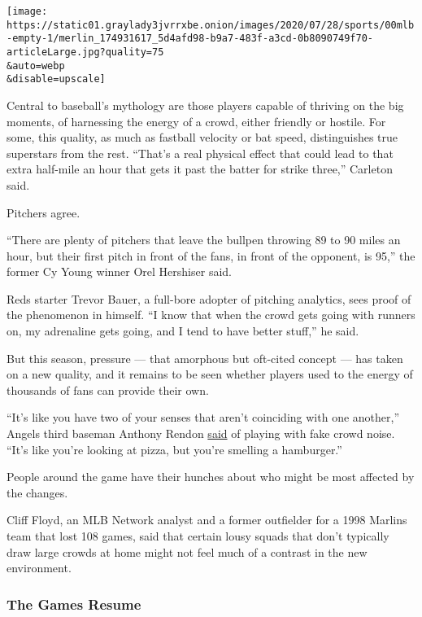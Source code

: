 \texttt{[image: https://static01.graylady3jvrrxbe.onion/images/2020/07/28/sports/00mlb-empty-1/merlin\_174931617\_5d4afd98-b9a7-483f-a3cd-0b8090749f70-articleLarge.jpg?quality=75\\\&auto=webp\\\&disable=upscale]}

Central to baseball's mythology are those players capable of thriving on
the big moments, of harnessing the energy of a crowd, either friendly or
hostile. For some, this quality, as much as fastball velocity or bat
speed, distinguishes true superstars from the rest. ``That's a real
physical effect that could lead to that extra half-mile an hour that
gets it past the batter for strike three,'' Carleton said.

Pitchers agree.

``There are plenty of pitchers that leave the bullpen throwing 89 to 90
miles an hour, but their first pitch in front of the fans, in front of
the opponent, is 95,'' the former Cy Young winner Orel Hershiser said.

Reds starter Trevor Bauer, a full-bore adopter of pitching analytics,
sees proof of the phenomenon in himself. ``I know that when the crowd
gets going with runners on, my adrenaline gets going, and I tend to have
better stuff,'' he said.

But this season, pressure --- that amorphous but oft-cited concept ---
has taken on a new quality, and it remains to be seen whether players
used to the energy of thousands of fans can provide their own.

``It's like you have two of your senses that aren't coinciding with one
another,'' Angels third baseman Anthony Rendon
\href{https://www.espn.com/mlb/story/_/id/29436493/angels-anthony-rendon-wants-music-dumb-piped-fan-noise}{said}
of playing with fake crowd noise. ``It's like you're looking at pizza,
but you're smelling a hamburger.''

People around the game have their hunches about who might be most
affected by the changes.

Cliff Floyd, an MLB Network analyst and a former outfielder for a 1998
Marlins team that lost 108 games, said that certain lousy squads that
don't typically draw large crowds at home might not feel much of a
contrast in the new environment.

\hypertarget{the-games-resume}{%
\subsubsection{The Games Resume}\label{the-games-resume}}

